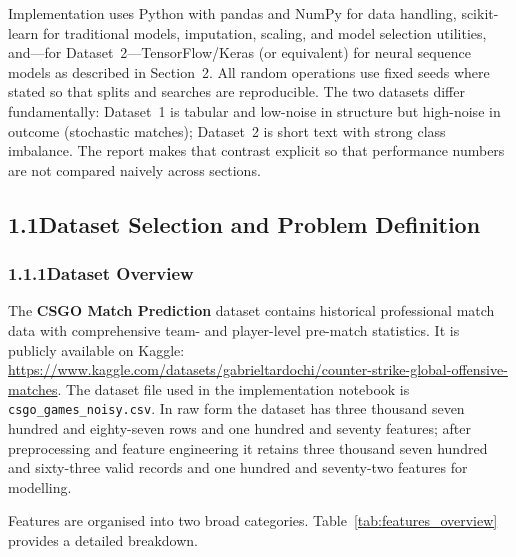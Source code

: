 \documentclass[12pt,a4paper]{article}
\begin{document}
Implementation uses Python with pandas and NumPy for data handling, scikit-learn for traditional models, imputation, scaling, and model selection utilities, and---for Dataset~2---TensorFlow/Keras (or equivalent) for neural sequence models as described in Section~2. All random operations use fixed seeds where stated so that splits and searches are reproducible. The two datasets differ fundamentally: Dataset~1 is tabular and low-noise in structure but high-noise in outcome (stochastic matches); Dataset~2 is short text with strong class imbalance. The report makes that contrast explicit so that performance numbers are not compared naively across sections.

\subsection{1.1\quad Dataset Selection and Problem Definition}

\subsubsection{1.1.1\quad Dataset Overview}

The \textbf{CSGO Match Prediction} dataset contains historical professional match data with comprehensive team- and player-level pre-match statistics. It is publicly available on Kaggle: \url{https://www.kaggle.com/datasets/gabrieltardochi/counter-strike-global-offensive-matches}. The dataset file used in the implementation notebook is \texttt{csgo\_games\_noisy.csv}. In raw form the dataset has three thousand seven hundred and eighty-seven rows and one hundred and seventy features; after preprocessing and feature engineering it retains three thousand seven hundred and sixty-three valid records and one hundred and seventy-two features for modelling.

Features are organised into two broad categories. Table~\ref{tab:features_overview} provides a detailed breakdown.
\end{document}
